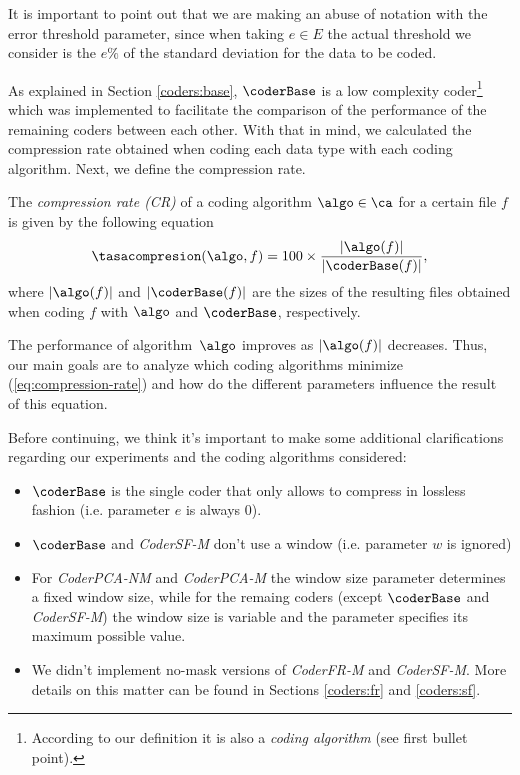 It is important to point out that we are making an abuse of notation with the error threshold parameter, since when taking $e \in E$ the actual threshold we consider is the $e\%$ of the standard deviation for the data to be coded.
    
\newcommand{\cbits}{\coder_{\textit{S}}}
\newcommand{\basebits}{\textit{Base}_{\textit{S}}}
\newcommand{\footcoderbase}{According to our definition it is also a \textit{coding algorithm} (see first bullet point).}
As explained in Section \ref{coders:base}, $\coderBase$ is a low complexity coder\footnote{\footcoderbase} which was implemented to facilitate the comparison of the performance of the remaining coders between each other. With that in mind, we calculated the compression rate obtained when coding each data type with each coding algorithm. Next, we define the compression rate.

\begin{defcion}
The \textit{compression rate (CR)} of a coding algorithm  $\algo \in \ca$ for a certain file $f$ is given by the following equation
\vspace{-5pt}
\begin{equation}
\label{eq:compression-rate}
\tasacompresion(\algo, f) = 100\times\frac{|\algo(f)|}{|\coderBase(f)|},
\end{equation}
where $|\algo(f)|$ and $|\coderBase(f)|$ are the sizes of the resulting files obtained when coding $f$ with $\algo$ and $\coderBase$, respectively.
\end{defcion}

The performance of algorithm~$\algo$ improves as $|\algo(f)|$ decreases. Thus, our main goals are to analyze which coding algorithms minimize (\ref{eq:compression-rate}) and how do the different parameters influence the result of this equation.

\vspace{+5pt}
Before continuing, we think it's important to make some additional clarifications regarding our experiments and the coding algorithms considered:

\vspace{-8pt}
\begin{itemize}
    \item $\coderBase$ is the single coder that only allows to compress in lossless fashion (i.e. parameter $e$ is always 0).
    \item $\coderBase$ and \textit{CoderSF-M} don't use a window (i.e. parameter $w$ is ignored) 
    \item For \textit{CoderPCA-NM} and \textit{CoderPCA-M} the window size parameter determines a fixed window size, while for the remaing coders (except $\coderBase$ and \textit{CoderSF-M}) the window size is variable and the parameter specifies its maximum possible value.
    \item We didn't implement no-mask versions of \textit{CoderFR-M} and \textit{CoderSF-M}. More details on this matter can be found in Sections \ref{coders:fr} and \ref{coders:sf}.
\end{itemize}












